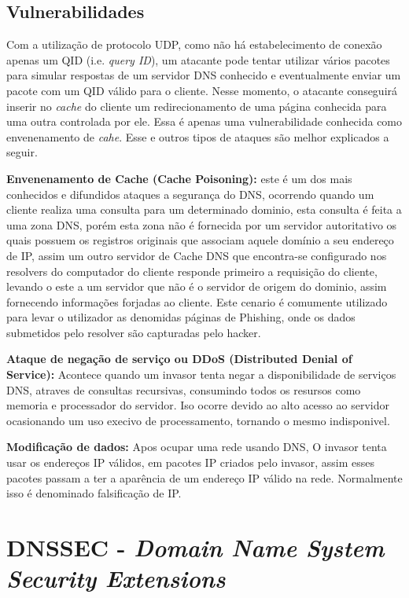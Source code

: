 \documentclass[a4paper]{report} %
\begin{document}
\section{Vulnerabilidades}
\label{sec_vulnerabilidades}

Com a utilização de protocolo UDP, como não há estabelecimento de conexão apenas um QID (i.e. \textit{query ID}), um atacante pode tentar utilizar vários pacotes para simular respostas de um servidor DNS conhecido e eventualmente enviar um pacote com um QID válido para o cliente. Nesse momento, o atacante conseguirá inserir no \textit{cache} do cliente um redirecionamento de uma página conhecida para uma outra controlada por ele. Essa é apenas uma vulnerabilidade conhecida como envenenamento de \textit{cahe}. Esse e outros tipos de ataques são melhor explicados a seguir.

{\bf Envenenamento de Cache (Cache Poisoning): }este é um dos mais conhecidos e difundidos ataques a segurança do DNS, ocorrendo quando um cliente realiza uma consulta para um determinado dominio, esta consulta é feita a uma zona DNS, porém esta zona não é fornecida por um servidor autoritativo os quais possuem os registros originais que associam aquele domínio a seu endereço de IP, assim um outro servidor de Cache DNS que encontra-se configurado nos resolvers do computador do cliente responde primeiro a requisição do cliente, levando o este a um servidor que não é o servidor de origem do dominio, assim fornecendo informações forjadas ao cliente. Este cenario é comumente utilizado para levar o utilizador as denomidas páginas de Phishing, onde os dados submetidos pelo resolver são capturadas pelo hacker.

{\bf Ataque de negação de serviço ou DDoS (Distributed Denial of Service): }Acontece quando um invasor tenta negar a disponibilidade de serviços DNS, atraves de consultas recursivas, consumindo todos os resursos como memoria e processador do servidor. Iso ocorre devido ao alto acesso ao servidor ocasionando um uso execivo de processamento, tornando o mesmo indisponivel.

{\bf Modificação de dados: } Apos ocupar uma rede usando DNS, O invasor tenta usar os endereços IP válidos, em pacotes IP criados pelo invasor, assim esses pacotes passam a ter a aparência de um endereço IP válido na rede. Normalmente isso é denominado falsificação de IP.

\chapter{ DNSSEC  - \textit{Domain Name System Security Extensions}}
\label{chap_dnssec}
\end{document}
